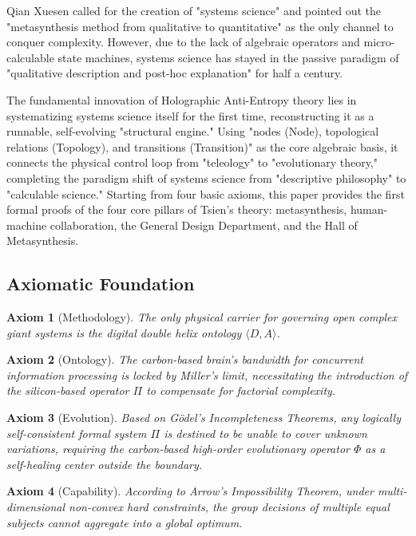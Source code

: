 \documentclass[11pt,a4paper]{article}
\newtheorem{axiom}{Axiom}[section]
\begin{document}

Qian Xuesen called for the creation of "systems science" and pointed out the "metasynthesis method from qualitative to quantitative" as the only channel to conquer complexity. However, due to the lack of algebraic operators and micro-calculable state machines, systems science has stayed in the passive paradigm of "qualitative description and post-hoc explanation" for half a century.

The fundamental innovation of Holographic Anti-Entropy theory lies in systematizing systems science itself for the first time, reconstructing it as a runnable, self-evolving "structural engine." Using "nodes (Node), topological relations (Topology), and transitions (Transition)" as the core algebraic basis, it connects the physical control loop from "teleology" to "evolutionary theory," completing the paradigm shift of systems science from "descriptive philosophy" to "calculable science." Starting from four basic axioms, this paper provides the first formal proofs of the four core pillars of Tsien's theory: metasynthesis, human-machine collaboration, the General Design Department, and the Hall of Metasynthesis.

\subsection*{Axiomatic Foundation}
\begin{axiom}[Methodology]
The only physical carrier for governing open complex giant systems is the digital double helix ontology $\langle D, A \rangle$.
\end{axiom}
\begin{axiom}[Ontology]
The carbon-based brain's bandwidth for concurrent information processing is locked by Miller's limit, necessitating the introduction of the silicon-based operator $\Pi$ to compensate for factorial complexity.
\end{axiom}
\begin{axiom}[Evolution]
Based on G\"odel's Incompleteness Theorems, any logically self-consistent formal system $\Pi$ is destined to be unable to cover unknown variations, requiring the carbon-based high-order evolutionary operator $\Phi$ as a self-healing center outside the boundary.
\end{axiom}
\begin{axiom}[Capability]
According to Arrow's Impossibility Theorem, under multi-dimensional non-convex hard constraints, the group decisions of multiple equal subjects cannot aggregate into a global optimum.
\end{axiom}
\end{document}
